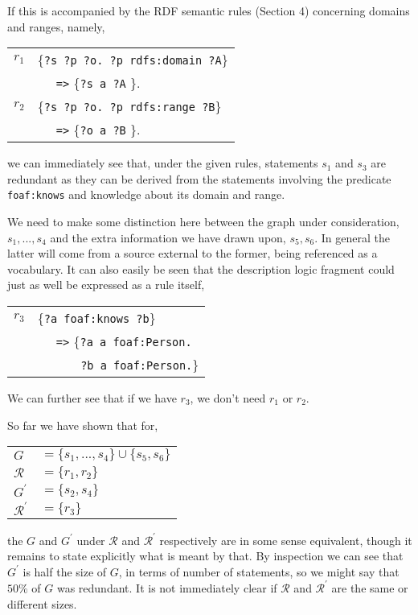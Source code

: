 \documentclass{article}
\begin{document}
If this is accompanied by the RDF semantic rules
\cite{RDFS04} (Section 4) concerning domains and 
ranges, namely,
\smallskip
\begin{center}
  \begin{tabular}{l|l}
    $r_1$ & \{\texttt{?s ?p ?o. ?p rdfs:domain ?A}\} \\
    & $\;\;\;\;$ \texttt{=>} \{\texttt{?s a ?A} \}. \\
    $r_2$ & \{\texttt{?s ?p ?o. ?p rdfs:range ?B}\} \\
    & $\;\;\;\;$ \texttt{=>} \{\texttt{?o a ?B} \}.
  \end{tabular}
\end{center}
\smallskip
we can immediately see that, under the given rules, statements
$s_1$ and $s_3$ are redundant as they can be derived from the
statements involving the predicate \texttt{foaf:knows} and
knowledge about its domain and range.

We need to make some distinction here between the graph under
consideration, ${ s_1, ..., s_4 }$ and the extra information
we have drawn upon, ${ s_5, s_6 }$. In general the latter will
come from a source external to the former, being referenced
as a vocabulary. It can also easily be seen that the description
logic fragment could just as well be expressed as a rule 
itself,
\smallskip
\begin{center}
  \begin{tabular}{l|l}
    $r_3$ & \{\texttt{?a foaf:knows ?b}\} \\
    & $\;\;\;\;$ \texttt{=>} \{\texttt{?a a foaf:Person.} \\
    & $\;\;\;\;$ \texttt{$\;\;\;\;\;$ ?b a foaf:Person.}\}
  \end{tabular}
\end{center}
\smallskip
  
We can further see that if we have $r_3$, we don't need $r_1$ 
or $r_2$.

So far we have shown that for,
\smallskip
\begin{center}
  \begin{tabular}{ll}
    $G$ & $= \{ s_1, ..., s_4 \} \cup \{ s_5, s_6 \}$ \\
    ${\mathcal R}$ & $= \{ r_1, r_2 \}$ \\
    $G^\prime$ & $= \{ s_2, s_4 \}$ \\
    ${\mathcal R}^\prime$ & $= \{ r_3 \}$
  \end{tabular}
\end{center}
\smallskip
the $G$ and $G^\prime$ under $\mathcal{R}$ and $\mathcal{R}^\prime$
respectively are in some sense equivalent, though it remains to state
explicitly what is meant by that. By inspection we can see that $G^\prime$
is half the size of $G$, in terms of number of statements, so we might say
that $50\%$ of $G$ was redundant. It is not immediately clear if
$\mathcal{R}$ and  ${\mathcal R}^\prime$ are the same or different
sizes.
\end{document}
